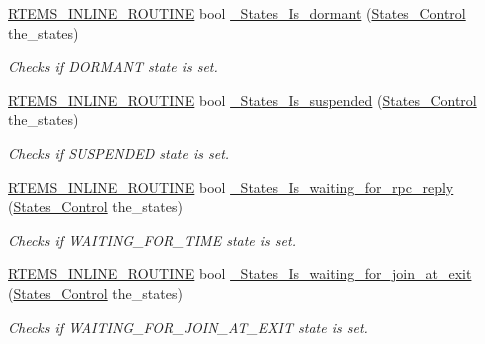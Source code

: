 \begin{DoxyCompactItemize}
\mbox{\hyperlink{group__RTEMSScoreBaseDefs_gac216239df231d5dbd15e3520b0b9313f}{R\+T\+E\+M\+S\+\_\+\+I\+N\+L\+I\+N\+E\+\_\+\+R\+O\+U\+T\+I\+NE}} bool \mbox{\hyperlink{group__RTEMSScoreStates_gab1378fca80d8015e09fe2fba6a736e89}{\+\_\+\+States\+\_\+\+Is\+\_\+dormant}} (\mbox{\hyperlink{group__RTEMSScoreStates_gaeebbea0bfca162709b124fd519cf99d3}{States\+\_\+\+Control}} the\+\_\+states)
\begin{DoxyCompactList}\small\item\em Checks if D\+O\+R\+M\+A\+NT state is set. \end{DoxyCompactList}\item 
\mbox{\hyperlink{group__RTEMSScoreBaseDefs_gac216239df231d5dbd15e3520b0b9313f}{R\+T\+E\+M\+S\+\_\+\+I\+N\+L\+I\+N\+E\+\_\+\+R\+O\+U\+T\+I\+NE}} bool \mbox{\hyperlink{group__RTEMSScoreStates_ga74a9088ded768a8aab5ba68defcf0c5e}{\+\_\+\+States\+\_\+\+Is\+\_\+suspended}} (\mbox{\hyperlink{group__RTEMSScoreStates_gaeebbea0bfca162709b124fd519cf99d3}{States\+\_\+\+Control}} the\+\_\+states)
\begin{DoxyCompactList}\small\item\em Checks if S\+U\+S\+P\+E\+N\+D\+ED state is set. \end{DoxyCompactList}\item 
\mbox{\hyperlink{group__RTEMSScoreBaseDefs_gac216239df231d5dbd15e3520b0b9313f}{R\+T\+E\+M\+S\+\_\+\+I\+N\+L\+I\+N\+E\+\_\+\+R\+O\+U\+T\+I\+NE}} bool \mbox{\hyperlink{group__RTEMSScoreStates_gae00cc74ed3a9ee8ba85ae406bcb1198f}{\+\_\+\+States\+\_\+\+Is\+\_\+waiting\+\_\+for\+\_\+rpc\+\_\+reply}} (\mbox{\hyperlink{group__RTEMSScoreStates_gaeebbea0bfca162709b124fd519cf99d3}{States\+\_\+\+Control}} the\+\_\+states)
\begin{DoxyCompactList}\small\item\em Checks if W\+A\+I\+T\+I\+N\+G\+\_\+\+F\+O\+R\+\_\+\+T\+I\+ME state is set. \end{DoxyCompactList}\item 
\mbox{\hyperlink{group__RTEMSScoreBaseDefs_gac216239df231d5dbd15e3520b0b9313f}{R\+T\+E\+M\+S\+\_\+\+I\+N\+L\+I\+N\+E\+\_\+\+R\+O\+U\+T\+I\+NE}} bool \mbox{\hyperlink{group__RTEMSScoreStates_ga0c8c375e47522dcd9cf7b6e9d84c21b5}{\+\_\+\+States\+\_\+\+Is\+\_\+waiting\+\_\+for\+\_\+join\+\_\+at\+\_\+exit}} (\mbox{\hyperlink{group__RTEMSScoreStates_gaeebbea0bfca162709b124fd519cf99d3}{States\+\_\+\+Control}} the\+\_\+states)
\begin{DoxyCompactList}\small\item\em Checks if W\+A\+I\+T\+I\+N\+G\+\_\+\+F\+O\+R\+\_\+\+J\+O\+I\+N\+\_\+\+A\+T\+\_\+\+E\+X\+IT state is set. \end{DoxyCompactList}\item 

\end{DoxyCompactItemize}
